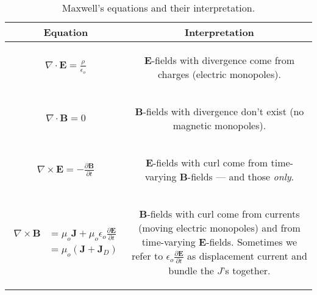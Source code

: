 \documentclass{article}
\begin{document}
\begin{table}[H]
\centering
{}
\caption*{Maxwell's equations and their interpretation.}
\begin{tabular}{@{}c|c@{}}
\toprule
Equation & Interpretation \\ \midrule
{\parbox[c]{0.3\linewidth}{\begin{gather*} \nabla \cdot \bm{E} = \frac{\rho}{\epsilon_o} \end{gather*}}} & {\parbox[c]{0.6\linewidth}{\begin{center} $\bm{E}$-fields with divergence come from charges (electric monopoles). \end{center}}} \\ \midrule
{\parbox[c]{0.3\linewidth}{\begin{gather*} \nabla \cdot \bm{B} = 0 \end{gather*}}} & {\parbox[c]{0.6\linewidth}{\begin{center} $\bm{B}$-fields with divergence don't exist (no magnetic monopoles). \end{center}}} \\ \midrule
{\parbox[c]{0.3\linewidth}{\begin{gather*} \nabla \times \bm{E} = -\frac{\partial \bm{B}}{\partial t} \end{gather*}}} & {\parbox[c]{0.6\linewidth}{\begin{center} $\bm{E}$-fields with curl come from time-varying $\bm{B}$-fields --- and those \emph{only}. \end{center}}} \\ \midrule
{\parbox[c]{0.3\linewidth}{\begin{align*} \nabla \times \bm{B} &= \mu_o \bm{J} + \mu_o \epsilon_o \frac{\partial \bm{E}}{\partial t} \\ &= \mu_o \left( \bm{J} + \bm{J}_D \right) \end{align*}}} & {\parbox[c]{0.6\linewidth}{\begin{center} $\bm{B}$-fields with curl come from currents (moving electric monopoles) and from time-varying $\bm{E}$-fields. Sometimes we refer to $\epsilon_o \frac{\partial \bm{E}}{\partial t}$ as displacement current and bundle the $J$'s together. \end{center}}} \\ \bottomrule
\end{tabular}
\end{table}
\end{document}

